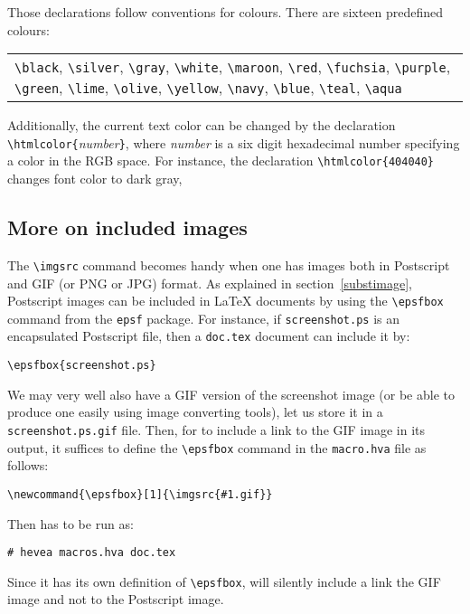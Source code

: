 Those declarations follow \html{} conventions for colours.
There are sixteen predefined colours:
\begin{center}
\begin{tabular}{p{.7\linewidth}}
\verb+\black+,
\verb+\silver+,
\verb+\gray+,
\verb+\white+,
\verb+\maroon+,
\verb+\red+,
\verb+\fuchsia+,
\verb+\purple+,
\verb+\green+,
\verb+\lime+,
\verb+\olive+,
\verb+\yellow+,
\verb+\navy+,
\verb+\blue+,
\verb+\teal+,
\verb+\aqua+
\end{tabular}
\end{center}
Additionally, the current text color can be
changed by the declaration \verb+\htmlcolor{+{\it number}\verb+}+,
where {\it number} is a six digit hexadecimal number specifying a
color in the RGB space.  For instance, the declaration
\verb+\htmlcolor{404040}+
changes font color to dark gray,

\subsection{More on included\label{imgsrc} images}
The \verb+\imgsrc+ command becomes handy when one has images both in
Postscript and GIF (or PNG or JPG) format.  As explained in
section~\ref{substimage}, Postscript images can be included in
\LaTeX{} documents by using the \verb+\epsfbox+ command from the
\texttt{epsf} package.  For instance, if \texttt{screenshot.ps} is an
encapsulated Postscript file, then a \texttt{doc.tex} document can
include it by:
\begin{verbatim}
\epsfbox{screenshot.ps}
\end{verbatim}
We may very well also have a GIF version of the screenshot image
(or be able to produce one easily using image converting tools),
let us store it in a \texttt{screenshot.ps.gif} file.
Then, for \hevea{} to include a link to the GIF image in its
output, it suffices
to define the \verb+\epsfbox+ command in the \texttt{macro.hva} file
as follows:
\begin{verbatim}
\newcommand{\epsfbox}[1]{\imgsrc{#1.gif}}
\end{verbatim}
Then \hevea{} has to be run as:
\begin{verbatim}
# hevea macros.hva doc.tex
\end{verbatim}
Since it has its own definition of \verb+\epsfbox+, \hevea{} will
silently include a link the GIF image and not to the Postscript image.

